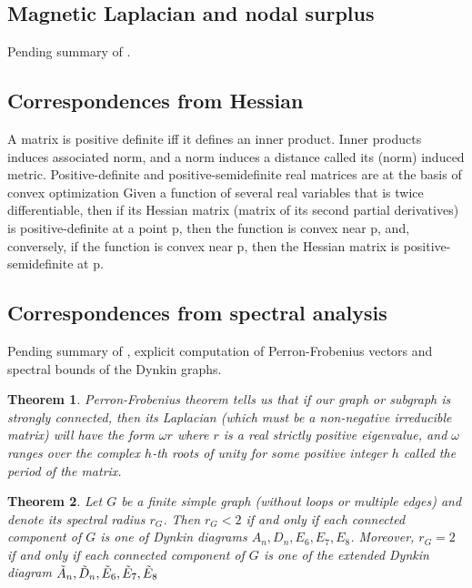 \documentclass{article}
\newtheorem{theorem}{Theorem}[section]
\theoremstyle{definition}
\begin{document}
\subsection{Magnetic Laplacian and nodal surplus}
\label{sec:magnetic-laplacian}

Pending summary of \cite{Berkolaiko_2013}.


\subsection{Correspondences from Hessian}
\label{sec:hessian-corr}

A matrix is positive definite iff it defines an inner product.
Inner products induces associated norm, and a norm induces a distance called its (norm) induced metric.
Positive-definite and positive-semidefinite real matrices are at the basis of convex optimization
Given a function of several real variables that is twice differentiable, then if its Hessian matrix (matrix of its second partial derivatives) is positive-definite at a point p, then the function is convex near p, and, conversely, if the function is convex near p, then the Hessian matrix is positive-semidefinite at p.

\subsection{Correspondences from spectral analysis}
\label{sec:spectral-corr}


Pending summary of \cite{ade-spectra}, explicit computation of Perron-Frobenius vectors and spectral bounds of the Dynkin graphs.

\begin{theorem}
    Perron-Frobenius theorem tells us that if our graph or subgraph is strongly connected, then its Laplacian (which must be a non-negative irreducible matrix) will have the form $\omega  r$ where $r$ is a real strictly positive eigenvalue, and $\omega$ ranges over the complex $h$-th roots of unity for some positive integer $h$ called the period of the matrix.
\end{theorem}

\begin{theorem}
    Let $G$ be a finite simple graph (without loops or multiple edges) and denote its spectral radius $r_G$. Then $r_G < 2$ if and only if each connected component of $G$ is one of Dynkin diagrams $A_n, D_n, E_6, E_7, E_8$. Moreover, $r_G = 2$ if and only if each connected component of $G$ is one of the extended Dynkin diagram $\Tilde{A}_n, \Tilde{D}_n, \Tilde{E}_6, \Tilde{E}_7, \Tilde{E}_8$
\end{theorem}
\end{document}
